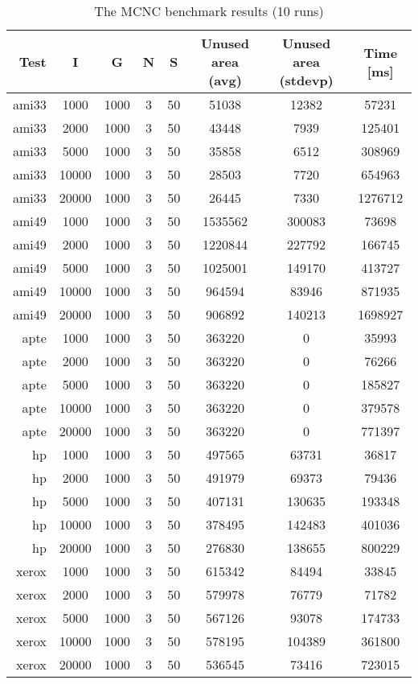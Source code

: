 \begin{table}
\centering
\begin{tabular}{|r|c|c|c|c|c|c|c|}
\hline
Test & I & G & N & S & Unused area (avg) & Unused area (stdevp) & Time [ms] \\
\hline
\hline
ami33 & 1000 & 1000 & 3 & 50 & 51038 & 12382 & 57231 \\
ami33 & 2000 & 1000 & 3 & 50 & 43448 & 7939 & 125401 \\
ami33 & 5000 & 1000 & 3 & 50 & 35858 & 6512 & 308969 \\
ami33 & 10000 & 1000 & 3 & 50 & 28503 & 7720 & 654963 \\
ami33 & 20000 & 1000 & 3 & 50 & 26445 & 7330 & 1276712 \\
\hline
ami49 & 1000 & 1000 & 3 & 50 & 1535562 & 300083 & 73698 \\
ami49 & 2000 & 1000 & 3 & 50 & 1220844 & 227792 & 166745 \\
ami49 & 5000 & 1000 & 3 & 50 & 1025001 & 149170 & 413727 \\
ami49 & 10000 & 1000 & 3 & 50 & 964594 & 83946 & 871935 \\
ami49 & 20000 & 1000 & 3 & 50 & 906892 & 140213 & 1698927 \\
\hline
apte & 1000 & 1000 & 3 & 50 & 363220 & 0 & 35993 \\
apte & 2000 & 1000 & 3 & 50 & 363220 & 0 & 76266 \\
apte & 5000 & 1000 & 3 & 50 & 363220 & 0 & 185827 \\
apte & 10000 & 1000 & 3 & 50 & 363220 & 0 & 379578 \\
apte & 20000 & 1000 & 3 & 50 & 363220 & 0 & 771397 \\
\hline
hp & 1000 & 1000 & 3 & 50 & 497565 & 63731 & 36817 \\
hp & 2000 & 1000 & 3 & 50 & 491979 & 69373 & 79436 \\
hp & 5000 & 1000 & 3 & 50 & 407131 & 130635 & 193348 \\
hp & 10000 & 1000 & 3 & 50 & 378495 & 142483 & 401036 \\
hp & 20000 & 1000 & 3 & 50 & 276830 & 138655 & 800229 \\
\hline
xerox & 1000 & 1000 & 3 & 50 & 615342 & 84494 & 33845 \\
xerox & 2000 & 1000 & 3 & 50 & 579978 & 76779 & 71782 \\
xerox & 5000 & 1000 & 3 & 50 & 567126 & 93078 & 174733 \\
xerox & 10000 & 1000 & 3 & 50 & 578195 & 104389 & 361800 \\
xerox & 20000 & 1000 & 3 & 50 & 536545 & 73416 & 723015 \\
\hline
\end{tabular}
\caption{The MCNC benchmark results (10 runs)}
\label{tab:mcnc}
\end{table}

